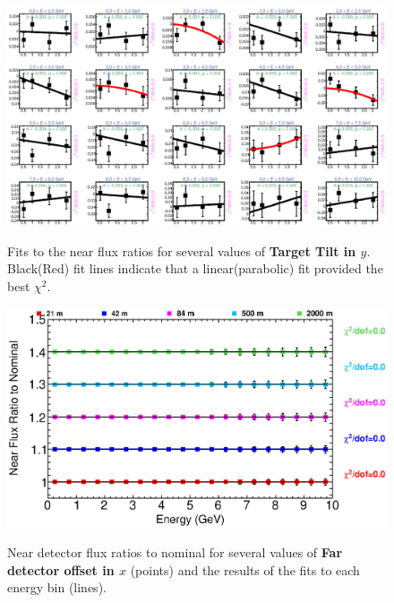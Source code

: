 \begin{figure}[ht]
  \begin{center}
    {\includegraphics[width=5.0in]{figures/TargetYTilt_near_fits.eps}}
  \end{center}
\caption{ Fits to the near flux ratios for several values of {\bf Target Tilt in $y$}. Black(Red) fit lines indicate that a linear(parabolic) fit provided the best $\chi^2$. }
\end{figure}


\begin{figure}[ht]
  \begin{center}
    {\includegraphics[width=6.0in]{figures/LBNEFDX_near_summary.eps}}
  \end{center}
\caption{ Near detector flux ratios to nominal for several values of {\bf Far detector offset in $x$} (points) and the results of the fits to each energy bin (lines).}
\end{figure}

